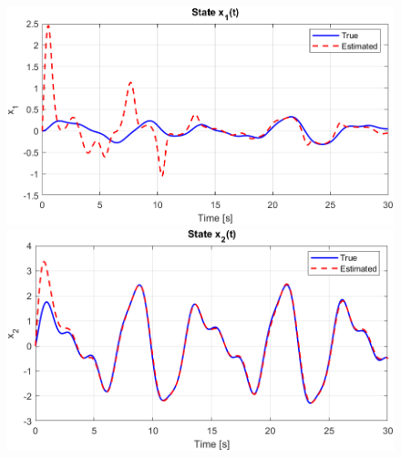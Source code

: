 \documentclass[12pt]{article} %
\numberwithin{equation}{section}  %
\begin{document}
\begin{figure}[ht!]
    \centering
    \begin{minipage}{0.48\textwidth}
        \centering
        \includegraphics[width=0.8\linewidth]{plots/plot6_1_x1_o1.png}
    \end{minipage}
    \hfill
    \begin{minipage}{0.48\textwidth}
        \centering
        \includegraphics[width=0.8\linewidth]{plots/plot6_2_x2_o1.png}
    \end{minipage}
    
    \vspace{1em} %
    

\end{figure}
\end{document}
